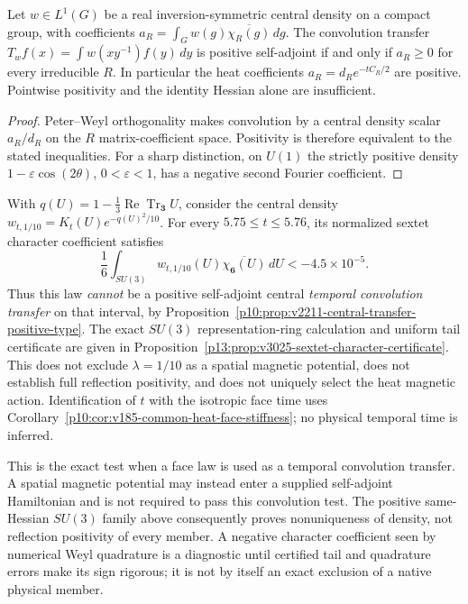 \documentclass[12pt,a4paper]{article}
\begin{document}
\begin{proposition}
\label{p10:prop:v2211-central-transfer-positive-type}
Let $w\in L^1(G)$ be a real inversion-symmetric central density on a compact
group, with coefficients $a_R=\int_Gw(g)\overline{\chi_R(g)}\,dg$.
The convolution transfer $T_wf(x)=\int w(xy^{-1})f(y)\,dy$ is positive
self-adjoint if and only if $a_R\ge0$ for every irreducible $R$.
In particular the heat coefficients $a_R=d_Re^{-tC_R/2}$ are positive.
Pointwise positivity and the identity Hessian alone are insufficient.
\end{proposition}
\begin{proof}
Peter--Weyl orthogonality makes convolution by a central density scalar
$a_R/d_R$ on the $R$ matrix-coefficient space. Positivity is therefore
equivalent to the stated inequalities. For a sharp distinction, on $U(1)$
the strictly positive density $1-\varepsilon\cos(2\theta)$,
$0<\varepsilon<1$, has a negative second Fourier coefficient.
\end{proof}


\begin{proposition}
\label{p10:prop:v3025-sextet-temporal-exclusion}
With $q(U)=1-\frac13\operatorname{Re}\operatorname{Tr}_{\mathbf3}U$,
consider the central density $w_{t,1/10}=K_t(U)e^{-q(U)^2/10}$.
For every $5.75\le t\le5.76$, its normalized sextet character
coefficient satisfies
\[
 \boxed{\frac16\int_{SU(3)}w_{t,1/10}(U)
 \overline{\chi_{\mathbf6}(U)}\,dU<-4.5\times10^{-5}.}
\]
Thus this law \emph{cannot} be a positive self-adjoint central
\emph{temporal convolution transfer} on that interval, by
Proposition~\ref{p10:prop:v2211-central-transfer-positive-type}.
The exact $SU(3)$ representation-ring calculation and uniform tail
certificate are given in
Proposition~\ref{p13:prop:v3025-sextet-character-certificate}.
This does not exclude $\lambda=1/10$ as a spatial magnetic potential,
does not establish full reflection positivity, and does not uniquely
select the heat magnetic action.  Identification of $t$ with the
isotropic face time uses
Corollary~\ref{p10:cor:v185-common-heat-face-stiffness}; no physical
temporal time is inferred.
\end{proposition}

This is the exact test when a face law is used as a temporal convolution
transfer. A spatial magnetic potential may instead enter a supplied
self-adjoint Hamiltonian and is not required to pass this convolution test.
The positive same-Hessian $SU(3)$ family above consequently proves
nonuniqueness of density, not reflection positivity of every member. A
negative character coefficient seen by numerical Weyl quadrature is a
diagnostic until certified tail and quadrature errors make its sign rigorous;
it is not by itself an exact exclusion of a native physical member.
\end{document}
